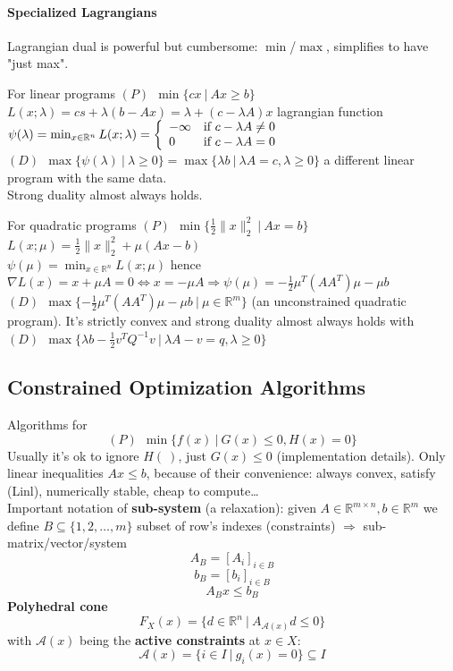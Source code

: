 \documentclass[10pt]{report}
\begin{document}
\paragraph{Specialized Lagrangians} Lagrangian dual is powerful but cumbersome: $\min$/$\max$, simplifies to have "just max".\begin{list}{}{}
	\item For linear programs $(P)\:\:\min\{cx\:|\:Ax\geq b\}$\\
	$L(x;\lambda) = cs + \lambda(b-Ax)=\lambda +(c-\lambda A)x$ lagrangian function\\
	$\psi(\lambda)=\min_{x\in \mathbb{R}^n} L(x;\lambda)=\left\{\begin{array}{l l}
	-\infty& \text{if }c-\lambda A\neq 0\\
	0& \text{if }c-\lambda A= 0\\
	\end{array}\right.$\\
	$(D)\:\:\max\{\psi(\lambda)\:|\:\lambda\geq 0\}=\max\{\lambda b\:|\:\lambda A=c, \lambda\geq 0\}$ a different linear program with the same data.\\
	Strong duality almost always holds.
	\item For quadratic programs $(P)\:\:\min\{\frac{1}{2}\|x\|_2^2\:|\:Ax = b\}$\\
	 $L(x;\mu)=\frac{1}{2}\|x\|_2^2+\mu(Ax-b)$\\
	 $\psi(\mu)=\min_{x\in \mathbb{R}^n} L(x;\mu)$ hence $\nabla L(x)=x+\mu A = 0 \Leftrightarrow x = - \mu A\Rightarrow \psi(\mu)=-\frac{1}{2}\mu^T(AA^T)\mu - \mu b$\\
	 $(D)\:\:\max\{-\frac{1}{2}\mu^T(AA^T)\mu-\mu b\:|\:\mu \in \mathbb{R}^m\}$ (an unconstrained quadratic program). It's strictly convex and strong duality almost always holds with $(D)\:\:\max\{\lambda b-\frac{1}{2}v^TQ^{-1}v\:|\:\lambda A-v=q, \lambda\geq 0\}$
\end{list}
\subsection{Constrained Optimization Algorithms} Algorithms for $$(P)\:\:\min\{f(x)\:|\:G(x)\leq 0, H(x) = 0\}$$
Usually it's ok to ignore $H(\:)$, just $G(x)\leq 0$ (implementation details). Only linear inequalities $Ax\leq b$, because of their convenience: always convex, satisfy (Linl), numerically stable, cheap to compute\ldots\\
Important notation of \textbf{sub-system} (a relaxation): given $A\in \mathbb{R}^{m\times n}, b\in \mathbb{R}^m$ we define $B\subseteq\{1,2,\ldots,m\}$ subset of row's indexes (constraints) $\Rightarrow$ sub-matrix/vector/system $$A_B=[A_i]_{i\in B}$$ $$b_B=[b_i]_{i\in B}$$ $$A_Bx \leq b_B$$
\textbf{Polyhedral cone} $$F_X(x)=\{d\in \mathbb{R}^n\:|\:A_{\mathscr{A}(x)} d\leq 0\}$$ with $\mathscr{A}(x)$ being the 
\textbf{active constraints} at $x\in X$: $$\mathscr{A}(x) = \{i\in I\:|\:g_i(x)=0\}\subseteq I$$
\end{document}
